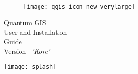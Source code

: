 \begin{titlepage}
\begin{center}

\begin{figure}[H]
\begin{center}
\texttt{[image: qgis\_icon\_new\_verylarge]} 
\end{center}
\end{figure}

\Huge{Quantum GIS}\\
\vspace{0.5cm}
\Large{User and Installation \\Guide} \\
\vspace{0.5cm}
\large{Version ~\CURRENT \textsl{'Kore'}}

\texttt{[image: splash]} 

\end{center}
\end{titlepage}
